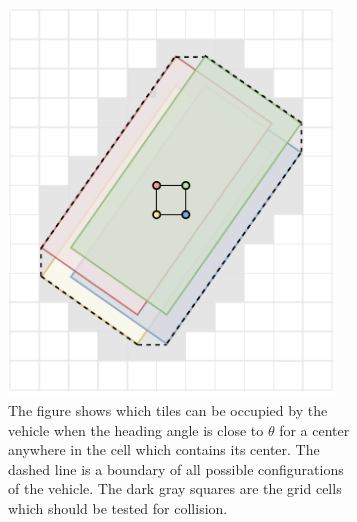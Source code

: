 \begin{figure}[!tbp]%
	\centering
	\begin{subfigure}[t]{0.45\textwidth}
		\centering
		\includegraphics[width=0.95\textwidth]{../img/footprint}
		\caption{The figure shows which tiles can be occupied by the vehicle when the heading angle is close to $\theta$ for a center anywhere in the cell which contains its center. The dashed line is a boundary of all possible configurations of the vehicle. The dark gray squares are the grid cells which should be tested for collision.}
		\label{fig:collision_detection_overlap}
	\end{subfigure}
	\hfill
	\begin{subfigure}[t]{0.45\textwidth}
		\centering

\end{subfigure}
\end{figure}
